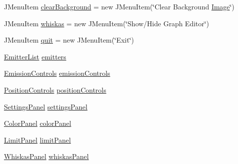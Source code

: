 \begin{DoxyCompactItemize}
J\+Menu\+Item \mbox{\hyperlink{classorg_1_1newdawn_1_1slick_1_1tools_1_1peditor_1_1_particle_editor_af1d353efe74a0dcadb3ec9598ee12c56}{clear\+Background}} = new J\+Menu\+Item(\char`\"{}Clear Background \mbox{\hyperlink{classorg_1_1newdawn_1_1slick_1_1_image}{Image}}\char`\"{})
\item 
J\+Menu\+Item \mbox{\hyperlink{classorg_1_1newdawn_1_1slick_1_1tools_1_1peditor_1_1_particle_editor_a4bfcec4ac290637e5f038a4c83603b6d}{whiskas}} = new J\+Menu\+Item(\char`\"{}Show/Hide Graph Editor\char`\"{})
\item 
J\+Menu\+Item \mbox{\hyperlink{classorg_1_1newdawn_1_1slick_1_1tools_1_1peditor_1_1_particle_editor_ad7c648f5dd388a57f8c61029e77a48a6}{quit}} = new J\+Menu\+Item(\char`\"{}Exit\char`\"{})
\item 
\mbox{\hyperlink{classorg_1_1newdawn_1_1slick_1_1tools_1_1peditor_1_1_emitter_list}{Emitter\+List}} \mbox{\hyperlink{classorg_1_1newdawn_1_1slick_1_1tools_1_1peditor_1_1_particle_editor_adf3a8d24a0adf9e68e06a87f37ff378a}{emitters}}
\item 
\mbox{\hyperlink{classorg_1_1newdawn_1_1slick_1_1tools_1_1peditor_1_1_emission_controls}{Emission\+Controls}} \mbox{\hyperlink{classorg_1_1newdawn_1_1slick_1_1tools_1_1peditor_1_1_particle_editor_ae90b330a4f8b1409927e2fb8dfa9129e}{emission\+Controls}}
\item 
\mbox{\hyperlink{classorg_1_1newdawn_1_1slick_1_1tools_1_1peditor_1_1_position_controls}{Position\+Controls}} \mbox{\hyperlink{classorg_1_1newdawn_1_1slick_1_1tools_1_1peditor_1_1_particle_editor_a76c56fedfdc262b7480ca49713204d48}{position\+Controls}}
\item 
\mbox{\hyperlink{classorg_1_1newdawn_1_1slick_1_1tools_1_1peditor_1_1_settings_panel}{Settings\+Panel}} \mbox{\hyperlink{classorg_1_1newdawn_1_1slick_1_1tools_1_1peditor_1_1_particle_editor_a520df4460af7a7d67e0b5e38f07aaab2}{settings\+Panel}}
\item 
\mbox{\hyperlink{classorg_1_1newdawn_1_1slick_1_1tools_1_1peditor_1_1_color_panel}{Color\+Panel}} \mbox{\hyperlink{classorg_1_1newdawn_1_1slick_1_1tools_1_1peditor_1_1_particle_editor_a16beabbea558c6b1d18e83566e52cb94}{color\+Panel}}
\item 
\mbox{\hyperlink{classorg_1_1newdawn_1_1slick_1_1tools_1_1peditor_1_1_limit_panel}{Limit\+Panel}} \mbox{\hyperlink{classorg_1_1newdawn_1_1slick_1_1tools_1_1peditor_1_1_particle_editor_ab08f2a8de74f4faa5c302a164031af8e}{limit\+Panel}}
\item 
\mbox{\hyperlink{classorg_1_1newdawn_1_1slick_1_1tools_1_1peditor_1_1_whiskas_panel}{Whiskas\+Panel}} \mbox{\hyperlink{classorg_1_1newdawn_1_1slick_1_1tools_1_1peditor_1_1_particle_editor_a6c7ab37c6cad16814266c87eced04ffe}{whiskas\+Panel}}

\end{DoxyCompactItemize}
